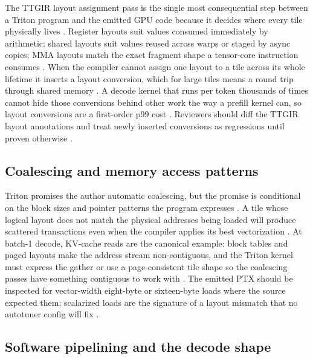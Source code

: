 The TTGIR layout assignment pass is the single most consequential step between a Triton program and the emitted GPU code because it decides where every tile physically lives \citep{tritonlang2024,semianalysis2024tma}. Register layouts suit values consumed immediately by arithmetic; shared layouts suit values reused across warps or staged by async copies; MMA layouts match the exact fragment shape a tensor-core instruction consumes \citep{tritonlang2024,nvidia2022hopper}. When the compiler cannot assign one layout to a tile across its whole lifetime it inserts a layout conversion, which for large tiles means a round trip through shared memory \citep{tritonlang2024,memoryfloor2026}. A decode kernel that runs per token thousands of times cannot hide those conversions behind other work the way a prefill kernel can, so layout conversions are a first-order p99 cost \citep{taxbreak2026,patel2025llminference}. Reviewers should diff the TTGIR layout annotations and treat newly inserted conversions as regressions until proven otherwise \citep{chen2020compilerbasedhardw,memoryfloor2026}.

\subsection{Coalescing and memory access patterns}

Triton promises the author automatic coalescing, but the promise is conditional on the block sizes and pointer patterns the program expresses \citep{tillet2019triton,tritonlang2024}. A tile whose logical layout does not match the physical addresses being loaded will produce scattered transactions even when the compiler applies its best vectorization \citep{semianalysis2024tma,memoryfloor2026}. At batch-1 decode, KV-cache reads are the canonical example: block tables and paged layouts make the address stream non-contiguous, and the Triton kernel must express the gather or use a page-consistent tile shape so the coalescing passes have something contiguous to work with \citep{kwon2023vllm,patel2025llminference}. The emitted PTX should be inspected for vector-width eight-byte or sixteen-byte loads where the source expected them; scalarized loads are the signature of a layout mismatch that no autotuner config will fix \citep{tritonlang2024,memoryfloor2026}.

\subsection{Software pipelining and the decode shape}

